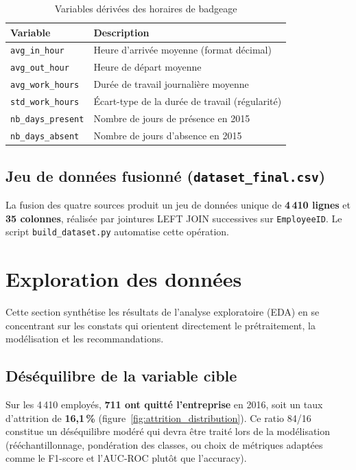 \begin{table}[htbp]
\centering
\caption{Variables dérivées des horaires de badgeage}
\small
\begin{tabularx}{\textwidth}{l X}
\toprule
\textbf{Variable} & \textbf{Description} \\
\midrule
\texttt{avg\_in\_hour} & Heure d'arrivée moyenne (format décimal) \\
\texttt{avg\_out\_hour} & Heure de départ moyenne \\
\texttt{avg\_work\_hours} & Durée de travail journalière moyenne \\
\texttt{std\_work\_hours} & Écart-type de la durée de travail (régularité) \\
\texttt{nb\_days\_present} & Nombre de jours de présence en 2015 \\
\texttt{nb\_days\_absent} & Nombre de jours d'absence en 2015 \\
\bottomrule
\end{tabularx}
\end{table}

\subsection{Jeu de données fusionné (\texttt{dataset\_final.csv})}

La fusion des quatre sources produit un jeu de données unique de \textbf{4\,410 lignes} et \textbf{35 colonnes}, réalisée par jointures LEFT JOIN successives sur \texttt{EmployeeID}. Le script \texttt{build\_dataset.py} automatise cette opération.

\section{Exploration des données}

Cette section synthétise les résultats de l'analyse exploratoire (EDA) en se concentrant sur les constats qui orientent directement le prétraitement, la modélisation et les recommandations.

\subsection{Déséquilibre de la variable cible}

Sur les 4\,410 employés, \textbf{711 ont quitté l'entreprise} en 2016, soit un taux d'attrition de \textbf{16,1\,\%} (figure~\ref{fig:attrition_distribution}). Ce ratio 84/16 constitue un déséquilibre modéré qui devra être traité lors de la modélisation (rééchantillonnage, pondération des classes, ou choix de métriques adaptées comme le F1-score et l'AUC-ROC plutôt que l'accuracy).

